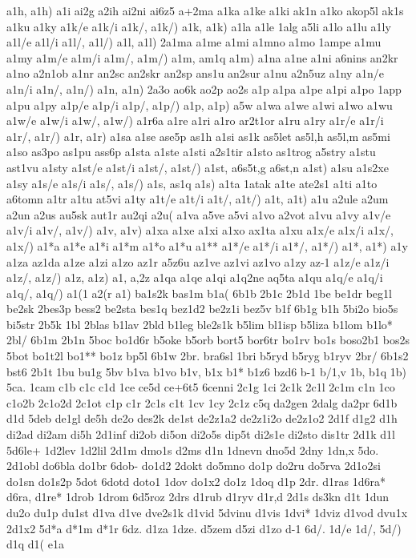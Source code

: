 {{a1h,
a1h)
a1i
ai2g
a2ih
ai2ni
ai6z5
a+2ma
a1ka
a1ke
a1ki
ak1n
a1ko
akop5l
ak1s
a1ku
a1ky
a1k/e
a1k/i
a1k/,
a1k/)
a1k,
a1k)
a1la
a1le
1alg
a5li
a1lo
a1lu
a1ly
a1l/e
a1l/i
a1l/,
a1l/)
a1l,
a1l)
2a1ma
a1me
a1mi
a1mno
a1mo
1ampe
a1mu
a1my
a1m/e
a1m/i
a1m/,
a1m/)
a1m,
am1q
a1m)
a1na
a1ne
a1ni
a6nins
an2kr
a1no
a2n1ob
a1nr
an2sc
an2skr
an2sp
ans1u
an2sur
a1nu
a2n5uz
a1ny
a1n/e
a1n/i
a1n/,
a1n/)
a1n,
a1n)
2a3o
ao6k
ao2p
ao2s
a1p
a1pa
a1pe
a1pi
a1po
1app
a1pu
a1py
a1p/e
a1p/i
a1p/,
a1p/)
a1p,
a1p)
a5w
a1wa
a1we
a1wi
a1wo
a1wu
a1w/e
a1w/i
a1w/,
a1w/)
a1r6a
a1re
a1ri
a1ro
ar2t1or
a1ru
a1ry
a1r/e
a1r/i
a1r/,
a1r/)
a1r,
a1r)
a1sa
a1se
ase5p
as1h
a1si
as1k
as5let
as5l,h
as5l,m
as5mi
a1so
as3po
as1pu
ass6p
a1sta
a1ste
a1sti
a2s1tir
a1sto
as1trog
a5stry
a1stu
ast1vu
a1sty
a1st/e
a1st/i
a1st/,
a1st/)
a1st,
a6s5t,g
a6st,n
a1st)
a1su
a1s2xe
a1sy
a1s/e
a1s/i
a1s/,
a1s/)
a1s,
as1q
a1s)
a1ta
1atak
a1te
ate2s1
a1ti
a1to
a6tomn
a1tr
a1tu
at5vi
a1ty
a1t/e
a1t/i
a1t/,
a1t/)
a1t,
a1t)
a1u
a2ule
a2um
a2un
a2us
au5sk
aut1r
au2qi
a2u(
a1va
a5ve
a5vi
a1vo
a2vot
a1vu
a1vy
a1v/e
a1v/i
a1v/,
a1v/)
a1v,
a1v)
a1xa
a1xe
a1xi
a1xo
ax1ta
a1xu
a1x/e
a1x/i
a1x/,
a1x/)
a1*a
a1*e
a1*i
a1*m
a1*o
a1*u
a1**
a1*/e
a1*/i
a1*/,
a1*/)
a1*,
a1*)
a1y
a1za
az1da
a1ze
a1zi
a1zo
az1r
a5z6u
az1ve
az1vi
az1vo
a1zy
az-1
a1z/e
a1z/i
a1z/,
a1z/)
a1z,
a1z)
a1,
a,2z
a1qa
a1qe
a1qi
a1q2ne
aq5ta
a1qu
a1q/e
a1q/i
a1q/,
a1q/)
a1(1
a2(r
a1)
ba1s2k
bas1m
b1a(
6b1b
2b1c
2b1d
1be
be1dr
beg1l
be2sk
2bes3p
bess2
be2sta
bes1q
bez1d2
be2z1i
bez5v
b1f
6b1g
b1h
5bi2o
bio5s
bi5str
2b5k
1bl
2blas
b1lav
2bld
b1leg
ble2s1k
b5lim
bl1isp
b5liza
b1lom
b1lo*
2bl/
6b1m
2b1n
5boc
bo1d6r
b5oke
b5orb
bort5
bor6tr
bo1rv
bo1s
boso2b1
bos2s
5bot
bo1t2l
bo1**
bo1z
bp5l
6b1w
2br.
bra6sl
1bri
b5ryd
b5ryg
b1ryv
2br/
6b1s2
bst6
2b1t
1bu
bu1g
5bv
b1va
b1vo
b1v,
b1x
b1*
b1z6
bzd6
b-1
b/1,v
1b,
b1q
1b)
5ca.
1cam
c1b
c1c
c1d
1ce
ce5d
ce+6t5
6cenni
2c1g
1ci
2c1k
2c1l
2c1m
c1n
1co
c1o2b
2c1o2d
2c1ot
c1p
c1r
2c1s
c1t
1cv
1cy
2c1z
c5q
da2gen
2dalg
da2pr
6d1b
d1d
5deb
de1gl
de5h
de2o
des2k
de1st
de2z1a2
de2z1i2o
de2z1o2
2d1f
d1g2
d1h
di2ad
di2am
di5h
2d1inf
di2ob
di5on
di2o5s
dip5t
di2s1e
di2sto
dis1tr
2d1k
d1l
5d6le+
1d2lev
1d2lil
2d1m
dmo1s
d2ms
d1n
1dnevn
dno5d
2dny
1dn,x
5do.
2d1obl
do6bla
do1br
6dob-
do1d2
2dokt
do5mno
do1p
do2ru
do5rva
2d1o2si
do1sn
do1s2p
5dot
6dotd
doto1
1dov
do1x2
do1z
1doq
d1p
2dr.
d1ras
1d6ra*
d6ra,
d1re*
1drob
1drom
6d5roz
2drs
d1rub
d1ryv
d1r,d
2d1s
ds3kn
d1t
1dun
du2o
du1p
du1st
d1va
d1ve
dve2s1k
d1vid
5dvinu
d1vis
1dvi*
1dviz
d1vod
dvu1x
2d1x2
5d*a
d*1m
d*1r
6dz.
d1za
1dze.
d5zem
d5zi
d1zo
d-1
6d/.
1d/e
1d/,
5d/)
d1q
d1(
e1a
}}
